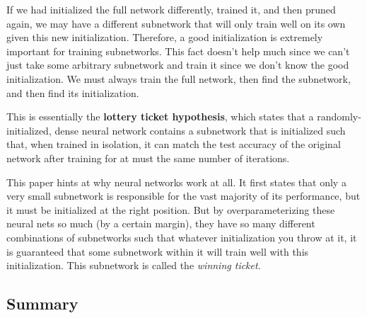 \documentclass{article}
\theoremstyle{definition}
\theoremstyle{remark}
\theoremstyle{definition}
\begin{document}
    If we had initialized the full network differently, trained it, and then pruned again, we may have a different subnetwork that will only train well on its own given this new initialization. Therefore, a good initialization is extremely important for training subnetworks. This fact doesn't help much since we can't just take some arbitrary subnetwork and train it since we don't know the good initialization. We must always train the full network, then find the subnetwork, and then find its initialization. 

    This is essentially the \textbf{lottery ticket hypothesis}, which states that a randomly-initialized, dense neural network contains a subnetwork that is initialized such that, when trained in isolation, it can match the test accuracy of the original network after training for at must the same number of iterations. 

    This paper hints at why neural networks work at all. It first states that only a very small subnetwork is responsible for the vast majority of its performance, but it must be initialized at the right position. But by overparameterizing these neural nets so much (by a certain margin), they have so many different combinations of subnetworks such that whatever initialization you throw at it, it is guaranteed that some subnetwork within it will train well with this initialization. This subnetwork is called the \textit{winning ticket}. 

  \subsection{Summary}
\end{document}

